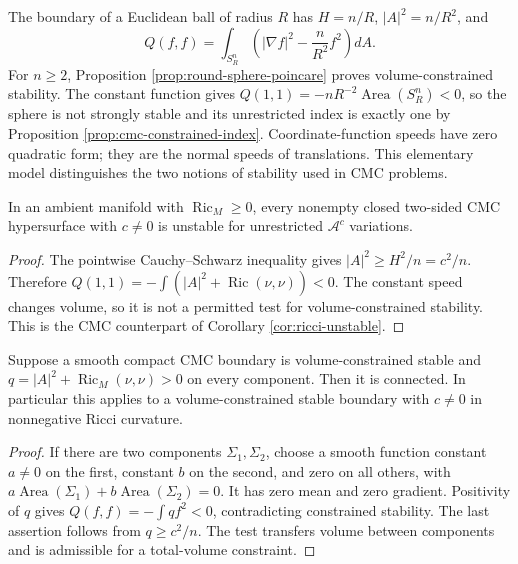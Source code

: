 \begin{example}\label{ex:round-cmc-stability}
The boundary of a Euclidean ball of radius $R$ has $H=n/R$, $|A|^2=n/R^2$, and
\[
 Q(f,f)=\int_{S_R^n}\left(|\nabla f|^2-\frac n{R^2}f^2\right)dA.
\]
For $n\geq2$, Proposition \ref{prop:round-sphere-poincare} proves volume-constrained stability. The constant function gives $Q(1,1)=-nR^{-2}\operatorname{Area}(S_R^n)<0$, so the sphere is not strongly stable and its unrestricted index is exactly one by Proposition \ref{prop:cmc-constrained-index}. Coordinate-function speeds have zero quadratic form; they are the normal speeds of translations. This elementary model distinguishes the two notions of stability used in CMC problems.
\end{example}

\begin{proposition}\label{prop:cmc-ricci-strong-instability}
In an ambient manifold with $\operatorname{Ric}_M\geq0$, every nonempty closed two-sided CMC hypersurface with $c\ne0$ is unstable for unrestricted $\mathcal A^c$ variations.
\end{proposition}
\begin{proof}
The pointwise Cauchy--Schwarz inequality gives $|A|^2\geq H^2/n=c^2/n$. Therefore
$Q(1,1)=-\int(|A|^2+\operatorname{Ric}(\nu,\nu))<0$.
The constant speed changes volume, so it is not a permitted test for volume-constrained stability. This is the CMC counterpart of Corollary \ref{cor:ricci-unstable}.
\end{proof}

\begin{proposition}\label{prop:cmc-stable-connectedness}
Suppose a smooth compact CMC boundary is volume-constrained stable and
$q=|A|^2+\operatorname{Ric}_M(\nu,\nu)>0$ on every component. Then it is connected. In particular this applies to a volume-constrained stable boundary with $c\ne0$ in nonnegative Ricci curvature.
\end{proposition}
\begin{proof}
If there are two components $\Sigma_1,\Sigma_2$, choose a smooth function constant $a\ne0$ on the first, constant $b$ on the second, and zero on all others, with $a\operatorname{Area}(\Sigma_1)+b\operatorname{Area}(\Sigma_2)=0$. It has zero mean and zero gradient. Positivity of $q$ gives $Q(f,f)=-\int qf^2<0$, contradicting constrained stability. The last assertion follows from $q\geq c^2/n$. The test transfers volume between components and is admissible for a total-volume constraint.
\end{proof}


